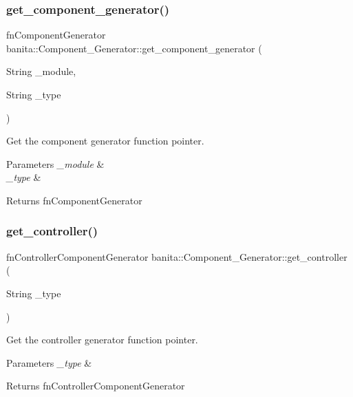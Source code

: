 \subsubsection{\texorpdfstring{get\_component\_generator()}{get\_component\_generator()}}
{\footnotesize\ttfamily fn\+Component\+Generator banita\+::\+Component\+\_\+\+Generator\+::get\+\_\+component\+\_\+generator (\begin{DoxyParamCaption}\item[{String}]{\+\_\+module,  }\item[{String}]{\+\_\+type }\end{DoxyParamCaption})}



Get the component generator function pointer. 


\begin{DoxyParams}{Parameters}
{\em \+\_\+module} & \\
\hline
{\em \+\_\+type} & \\
\hline
\end{DoxyParams}
\begin{DoxyReturn}{Returns}
fn\+Component\+Generator 
\end{DoxyReturn}
\mbox{\label{classbanita_1_1_component___generator_a607e2c3ac5e7f0b8d419e610d419f3a6}} 
\subsubsection{\texorpdfstring{get\_controller()}{get\_controller()}}
{\footnotesize\ttfamily fn\+Controller\+Component\+Generator banita\+::\+Component\+\_\+\+Generator\+::get\+\_\+controller (\begin{DoxyParamCaption}\item[{String}]{\+\_\+type }\end{DoxyParamCaption})\hspace{0.3cm}{\ttfamily [inline]}}



Get the controller generator function pointer. 


\begin{DoxyParams}{Parameters}
{\em \+\_\+type} & \\
\hline
\end{DoxyParams}
\begin{DoxyReturn}{Returns}
fn\+Controller\+Component\+Generator 
\end{DoxyReturn}
\mbox{\label{classbanita_1_1_component___generator_a026cadc610c5c75a911ed1299047190a}} 
